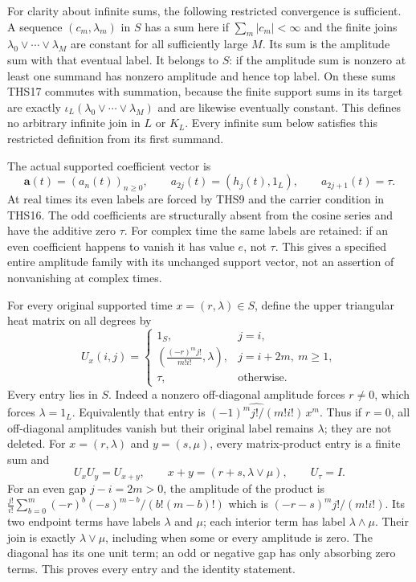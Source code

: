 \documentclass[11pt]{article}
\theoremstyle{definition}
\begin{document}
For clarity about infinite sums, the following restricted
convergence is sufficient. A sequence $(c_m,\lambda_m)$ in $S$
has a sum here if $\sum_m|c_m|<\infty$ and the finite joins
$\lambda_0\vee\cdots\vee\lambda_M$ are constant for all
sufficiently large $M$. Its sum is the amplitude sum with that
eventual label. It belongs to $S$: if the amplitude sum is
nonzero at least one summand has nonzero amplitude and hence
top label. On these sums THS17 commutes with summation, because
the finite support sums in its target are exactly
$\iota_L(\lambda_0\vee\cdots\vee\lambda_M)$ and are likewise
eventually constant. This defines no arbitrary infinite join
in $L$ or $K_L$. Every infinite sum below satisfies this
restricted definition from its first summand.

The actual supported coefficient vector is
\begin{equation}\tag{THS18}
 \mathbf a(t)=(a_n(t))_{n\ge0},\qquad
 a_{2j}(t)=(h_j(t),1_L),\qquad a_{2j+1}(t)=\tau.
\end{equation}
At real times its even labels are forced by THS9 and the carrier
condition in THS16. The odd coefficients are structurally absent
from the cosine series and have the additive zero $\tau$.
For complex time the same labels are retained: if an even
coefficient happens to vanish it has value $e$, not $\tau$.
This gives a specified entire amplitude family with its unchanged
support vector, not an assertion of nonvanishing at complex times.

For every original supported time $x=(r,\lambda)\in S$, define
the upper triangular heat matrix on all degrees by
\begin{equation}\tag{THS19}
 U_x(i,j)=
 \begin{cases}
 1_S,&j=i,\\
 \displaystyle\left(\frac{(-r)^m j!}{m!i!},\lambda\right),
       &j=i+2m,\ m\ge1,\\
 \tau,&\text{otherwise}.
 \end{cases}
\end{equation}
Every entry lies in $S$. Indeed a nonzero off-diagonal amplitude
forces $r\ne0$, which forces $\lambda=1_L$. Equivalently that
entry is $\widehat{(-1)^m j!/(m!i!)}\,x^m$.
Thus if $r=0$, all off-diagonal amplitudes vanish but their
original label remains $\lambda$; they are not deleted.
For $x=(r,\lambda)$ and $y=(s,\mu)$, every matrix-product entry
is a finite sum and
\begin{equation}\tag{THS20}
 U_xU_y=U_{x+y},\qquad
 x+y=(r+s,\lambda\vee\mu),\qquad U_\tau=I.
\end{equation}
For an even gap $j-i=2m>0$, the amplitude of the product is
$\frac{j!}{i!}\sum_{b=0}^m(-r)^b(-s)^{m-b}/(b!(m-b)!)$
which is $(-r-s)^mj!/(m!i!)$. Its two endpoint terms have
labels $\lambda$ and $\mu$; each interior term has label
$\lambda\wedge\mu$. Their join is exactly $\lambda\vee\mu$,
including when some or every amplitude is zero. The diagonal
has its one unit term; an odd or negative gap has only absorbing
zero terms. This proves every entry and the identity statement.
\end{document}

